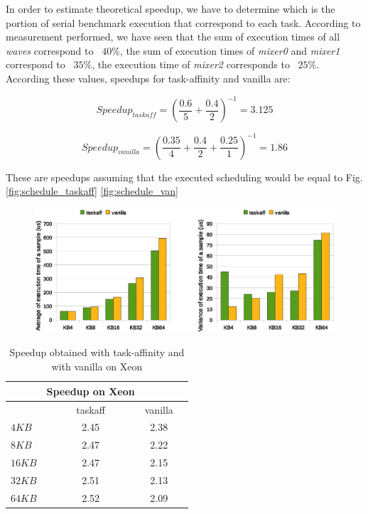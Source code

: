 In order to estimate theoretical speedup, we have to determine which is the portion of serial benchmark execution that correspond to each task.
According to measurement performed, we have seen that the sum of execution times of all \textit{waves} correspond to ~$40\%$, the sum of execution times of 
\textit{mixer0} and \textit{mixer1} correspond to ~$35\%$, the execution time of \textit{mixer2} corresponds to ~$25\%$. According these values, speedups 
for task-affinity and vanilla are:

\begin{equation}
  Speedup_{taskaff} = \left(\frac{0.6}{5} + \frac{0.4}{2} \right)^{-1} = 3.125
\label{eq:speedup_xeon_taskaff}
\end{equation}

\begin{equation}
  Speedup_{vanilla} = \left(\frac{0.35}{4} + \frac{0.4}{2} + \frac{0.25}{1} \right)^{-1} = 1.86
\label{eq:speedup_xeon_van}
\end{equation}


These are speedups assuming that the executed scheduling would be equal to Fig. \ref{fig:schedule_taskaff} \ref{fig:schedule_van}

\begin{figure}[htbp]
\centering
\includegraphics[width=\widefigure]{images/results_xeon/time_avg_var.eps}
\caption{}
\label{fig:time_avg_var_xeon}
\end{figure}

\begin{table}[htbp]
\begin{center}
\begin{tabular}{l|c|c|c}
	\hline
	& Speedup on Xeon \\ \hline
	& taskaff & vanilla \\ \hline
	$4KB$ & 2.45 & 2.38 \\ \hline
	$8KB$ & 2.47 & 2.22  \\ \hline
	$16KB$ & 2.47 & 2.15 \\ \hline
	$32KB$  & 2.51 & 2.13 \\ \hline
	$64KB$  & 2.52 & 2.09 \\ \hline
\end{tabular}
\label{tab:speedup_xeon_i7}
\caption{Speedup obtained with task-affinity and with vanilla on Xeon}
\end{center}
\end{table}

